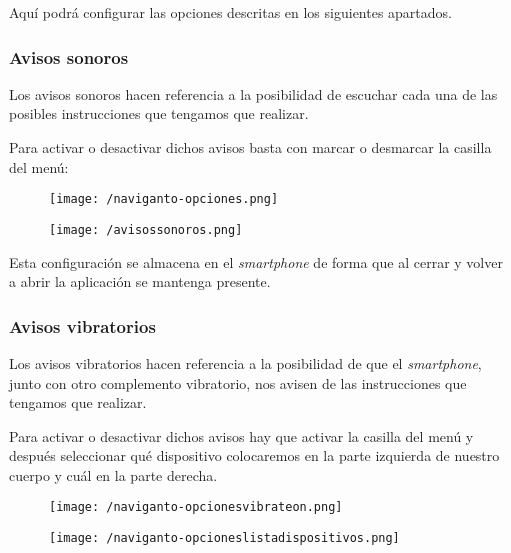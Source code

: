 Aquí podrá configurar las opciones descritas en los siguientes apartados.

\subsubsection{Avisos sonoros}

Los avisos sonoros hacen referencia a la posibilidad de escuchar cada una de las posibles
instrucciones que tengamos que realizar.

Para activar o desactivar dichos avisos basta con marcar o desmarcar la casilla del menú:

\begin{figure}[h]
  \begin{minipage}[b]{0.5\linewidth}
    \begin{center}
      \texttt{[image: /naviganto-opciones.png]}
    \end{center}
  \end{minipage}
  \begin{minipage}[b]{0.5\linewidth}
    \begin{center}
      \texttt{[image: /avisossonoros.png]}
    \end{center}
  \end{minipage}
\end{figure}

Esta configuración se almacena en el \emph{smartphone} de forma que al cerrar y volver a abrir la
aplicación se mantenga presente.

\subsubsection{Avisos vibratorios}

Los avisos vibratorios hacen referencia a la posibilidad de que el \emph{smartphone}, junto con otro
complemento vibratorio, nos avisen de las instrucciones que tengamos que realizar.

Para activar o desactivar dichos avisos hay que activar la casilla del menú y después seleccionar
qué dispositivo colocaremos en la parte izquierda de nuestro cuerpo y cuál en la parte derecha.

\begin{figure}[h]
  \begin{minipage}[b]{0.5\linewidth}
    \begin{center}
      \texttt{[image: /naviganto-opcionesvibrateon.png]}
    \end{center}
  \end{minipage}
  \begin{minipage}[b]{0.5\linewidth}
    \begin{center}
      \texttt{[image: /naviganto-opcioneslistadispositivos.png]}
    \end{center}
  \end{minipage}
\end{figure}

